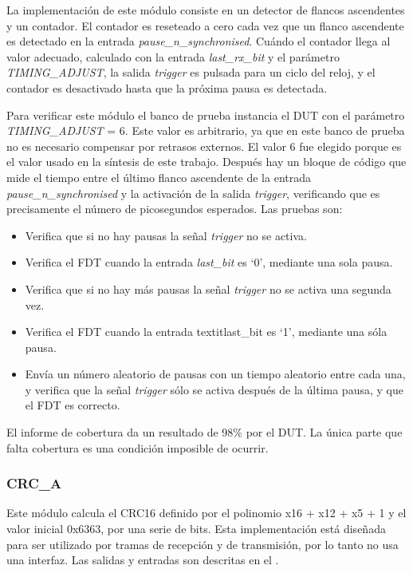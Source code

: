 \documentclass[a4paper, twoside, 11pt]{report}
\begin{document}
La implementación de este módulo consiste en un detector de flancos ascendentes y un contador. El contador es reseteado a cero cada vez que un flanco ascendente es detectado en la entrada \textit{pause\_n\_synchronised}. Cuándo el contador llega al valor adecuado, calculado con la entrada \textit{last\_rx\_bit} y el parámetro \textit{TIMING\_ADJUST}, la salida \textit{trigger} es pulsada para un ciclo del reloj, y el contador es desactivado hasta que la próxima pausa es detectada.

Para verificar este módulo el banco de prueba instancia el DUT con el parámetro \textit{TIMING\_ADJUST} = 6. Este valor es arbitrario, ya que en este banco de prueba no es necesario compensar por retrasos externos. El valor 6 fue elegido porque es el valor usado en la síntesis de este trabajo. Después hay un bloque de código que mide el tiempo entre el último flanco ascendente de la entrada \textit{pause\_n\_synchronised} y la activación de la salida \textit{trigger}, verificando que es precisamente el número de picosegundos esperados. Las pruebas son:

\begin{itemize}
  \item Verifica que si no hay pausas la señal \textit{trigger} no se activa.
  \item Verifica el FDT cuando la entrada \textit{last\_bit} es ‘0’, mediante una sola pausa.
  \item Verifica que si no hay más pausas la señal \textit{trigger} no se activa una segunda vez.
  \item Verifica el FDT cuando la entrada textit{last\_bit} es ‘1’, mediante una sóla pausa.
  \item Envía un número aleatorio de pausas con un tiempo aleatorio entre cada una, y verifica que la señal \textit{trigger} sólo se activa después de la última pausa, y que el FDT es correcto.
\end{itemize}

El informe de cobertura da un resultado de 98\% por el DUT. La única parte que falta cobertura es una condición imposible de ocurrir.

\FloatBarrier
\subsubsection{CRC\_A}

Este módulo calcula el CRC16 definido por el polinomio x16 + x12 + x5 + 1 y el valor inicial 0x6363, por una serie de bits. Esta implementación está diseñada para ser utilizado por tramas de recepción y de transmisión, por lo tanto no usa una interfaz. Las salidas y entradas son descritas en el .
\end{document}
